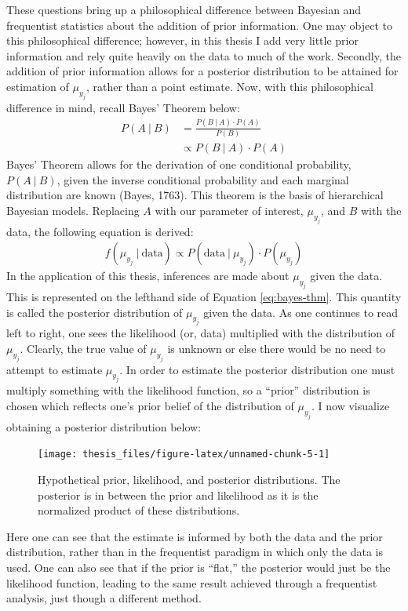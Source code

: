 \documentclass[12pt,twoside]{reedthesis}
\begin{document}
These questions bring up a philosophical difference between Bayesian and frequentist statistics about the addition of prior information. One may object to this philosophical difference; however, in this thesis I add very little prior information and rely quite heavily on the data to much of the work. Secondly, the addition of prior information allows for a posterior distribution to be attained for estimation of \(\mu_{y_j}\), rather than a point estimate. Now, with this philosophical difference in mind, recall Bayes' Theorem below:
\begin{align}
P(A ~\vert~ B) &= \frac{P(B ~\vert~ A) \cdot P(A)}{P(B)} \\
&\propto P(B ~\vert~ A) \cdot P(A)
\end{align}
Bayes' Theorem allows for the derivation of one conditional probability, \(P(A ~\vert~ B)\), given the inverse conditional probability and each marginal distribution are known (Bayes, 1763). This theorem is the basis of hierarchical Bayesian models. Replacing \(A\) with our parameter of interest, \(\mu_{y_j}\), and \(B\) with the data, the following equation is derived:
\begin{align}
f(\mu_{y_j} ~\vert~ \text{data}) \propto P(\text{data} ~\vert~ \mu_{y_j}) \cdot P(\mu_{y_j})
\label{eq:bayes-thm}
\end{align}
In the application of this thesis, inferences are made about \(\mu_{y_j}\) given the data. This is represented on the lefthand side of Equation \eqref{eq:bayes-thm}. This quantity is called the posterior distribution of \(\mu_{y_j}\) given the data. As one continues to read left to right, one sees the likelihood (or, data) multiplied with the distribution of \(\mu_{y_j}\). Clearly, the true value of \(\mu_{y_j}\) is unknown or else there would be no need to attempt to estimate \(\mu_{y_j}\). In order to estimate the posterior distribution one must multiply something with the likelihood function, so a ``prior'' distribution is chosen which reflects one's prior belief of the distribution of \(\mu_{y_j}\). I now visualize obtaining a posterior distribution below:
\clearpage
\begin{figure}
\texttt{[image: thesis\_files/figure-latex/unnamed-chunk-5-1]} \caption[Prior, likelihood, and posterior distributions.]{Hypothetical prior, likelihood, and posterior distributions. The posterior is in between the prior and likelihood as it is the normalized product of these distributions.}\label{fig:unnamed-chunk-5}
\end{figure}
Here one can see that the estimate is informed by both the data and the prior distribution, rather than in the frequentist paradigm in which only the data is used. One can also see that if the prior is ``flat,'' the posterior would just be the likelihood function, leading to the same result achieved through a frequentist analysis, just though a different method.
\end{document}
